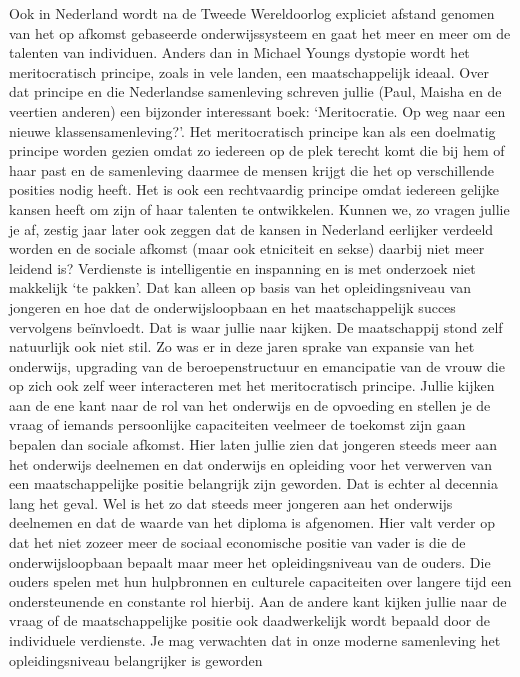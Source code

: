 \documentclass[]{book}
\begin{document}
Ook in Nederland wordt na de Tweede Wereldoorlog expliciet afstand
genomen van het op afkomst gebaseerde onderwijssysteem en gaat het meer
en meer om de talenten van individuen. Anders dan in Michael Youngs
dystopie wordt het meritocratisch principe, zoals in vele landen, een
maatschappelijk ideaal. Over dat principe en die Nederlandse samenleving
schreven jullie (Paul, Maisha en de veertien anderen) een bijzonder
interessant boek: `Meritocratie. Op weg naar een nieuwe
klassensamenleving?'. Het meritocratisch principe kan als een doelmatig
principe worden gezien omdat zo iedereen op de plek terecht komt die bij
hem of haar past en de samenleving daarmee de mensen krijgt die het op
verschillende posities nodig heeft. Het is ook een rechtvaardig principe
omdat iedereen gelijke kansen heeft om zijn of haar talenten te
ontwikkelen. Kunnen we, zo vragen jullie je af, zestig jaar later ook
zeggen dat de kansen in Nederland eerlijker verdeeld worden en de
sociale afkomst (maar ook etniciteit en sekse) daarbij niet meer leidend
is? Verdienste is intelligentie en inspanning en is met onderzoek niet
makkelijk `te pakken'. Dat kan alleen op basis van het opleidingsniveau
van jongeren en hoe dat de onderwijsloopbaan en het maatschappelijk
succes vervolgens beïnvloedt. Dat is waar jullie naar kijken. De
maatschappij stond zelf natuurlijk ook niet stil. Zo was er in deze
jaren sprake van expansie van het onderwijs, upgrading van de
beroepenstructuur en emancipatie van de vrouw die op zich ook zelf weer
interacteren met het meritocratisch principe. Jullie kijken aan de ene
kant naar de rol van het onderwijs en de opvoeding en stellen je de
vraag of iemands persoonlijke capaciteiten veelmeer de toekomst zijn
gaan bepalen dan sociale afkomst. Hier laten jullie zien dat jongeren
steeds meer aan het onderwijs deelnemen en dat onderwijs en opleiding
voor het verwerven van een maatschappelijke positie belangrijk zijn
geworden. Dat is echter al decennia lang het geval. Wel is het zo dat
steeds meer jongeren aan het onderwijs deelnemen en dat de waarde van
het diploma is afgenomen. Hier valt verder op dat het niet zozeer meer
de sociaal economische positie van vader is die de onderwijsloopbaan
bepaalt maar meer het opleidingsniveau van de ouders. Die ouders spelen
met hun hulpbronnen en culturele capaciteiten over langere tijd een
ondersteunende en constante rol hierbij. Aan de andere kant kijken
jullie naar de vraag of de maatschappelijke positie ook daadwerkelijk
wordt bepaald door de individuele verdienste. Je mag verwachten dat in
onze moderne samenleving het opleidingsniveau belangrijker is geworden
\end{document}
